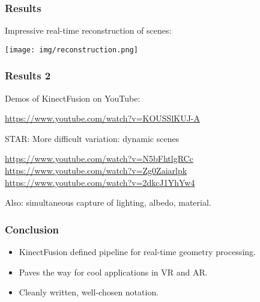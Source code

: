 \begin{frame}
  \frametitle{Results}

Impressive real-time reconstruction of scenes:

\texttt{[image: img/reconstruction.png]}
\end{frame}


\begin{frame}
  \frametitle{Results 2}

Demos of KinectFusion on YouTube:

  \url{https://www.youtube.com/watch?v=KOUSSlKUJ-A}

STAR: More difficult variation: dynamic scenes

\url{https://www.youtube.com/watch?v=N5bFhtlgRCc}
\url{https://www.youtube.com/watch?v=Zg0Zaiarlpk}
\url{https://www.youtube.com/watch?v=2dkcJ1YhYw4}

Also: simultaneous capture of lighting, albedo, material.
\end{frame}

\begin{frame}
  \frametitle{Conclusion}
\begin{itemize}
\item KinectFusion defined pipeline for real-time geometry processing.
\item Paves the way for cool applications in VR and AR.
\item Cleanly written, well-chosen notation.
\end{itemize}

\end{frame}
